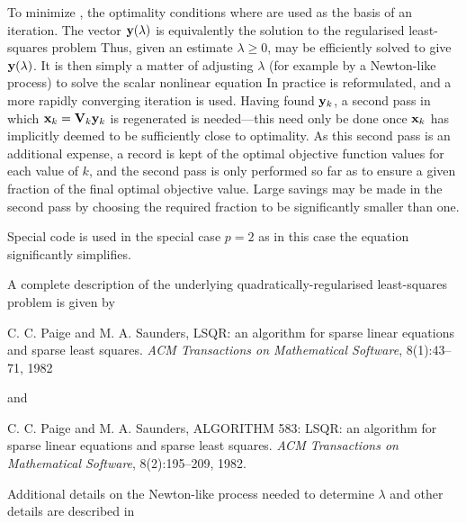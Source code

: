 \documentclass{galahad}
\begin{document}
To minimize , the optimality conditions
where
are used as the basis of an iteration.
The vector ${\mathbf{y}}(\lambda)$ is equivalently the solution to the
regularised least-squares problem
Thus, given an estimate $\lambda \geq 0$,  may be efficiently
solved to give ${\mathbf{y}}(\lambda)$.
It is then simply a matter of adjusting $\lambda$
(for example by a Newton-like process) to solve the scalar nonlinear equation
In practice  is reformulated, and a more rapidly converging iteration is
used. Having found  ${\mathbf{y}}_k$, a second pass in which
${\mathbf{x}}_k = {\mathbf{V}}_k {\mathbf{y}}_k$ is regenerated is needed---this need only be done
once ${\mathbf{x}}_k$ has implicitly deemed to be sufficiently close to optimality.
As this second pass is an additional expense, a record is kept of the
optimal objective function values for each value of $k$, and the second
pass is only performed so far as to ensure a given fraction of the
final optimal objective value. Large savings may be made in the second
pass by choosing the required fraction to be significantly smaller than one.

Special code is used in the special case $p=2$ as in this case the
equation  significantly simplifies.

\galreferences
A complete description of the underlying quadratically-regularised
least-squares problem is given by
\vspace*{1mm}

\noindent
C. C. Paige and M. A. Saunders,
LSQR: an algorithm for sparse linear equations and sparse least  squares.
{\em ACM Transactions on Mathematical Software}, 8(1):43--71, 1982

\noindent
and

\noindent
C. C. Paige and M. A. Saunders,
ALGORITHM 583: LSQR: an algorithm for sparse linear equations and
  sparse least squares.
{\em ACM Transactions on Mathematical Software}, 8(2):195--209, 1982.

\noindent
Additional details on the Newton-like process needed to determine $\lambda$ and
other details are described in
\vspace*{1mm}
\end{document}
